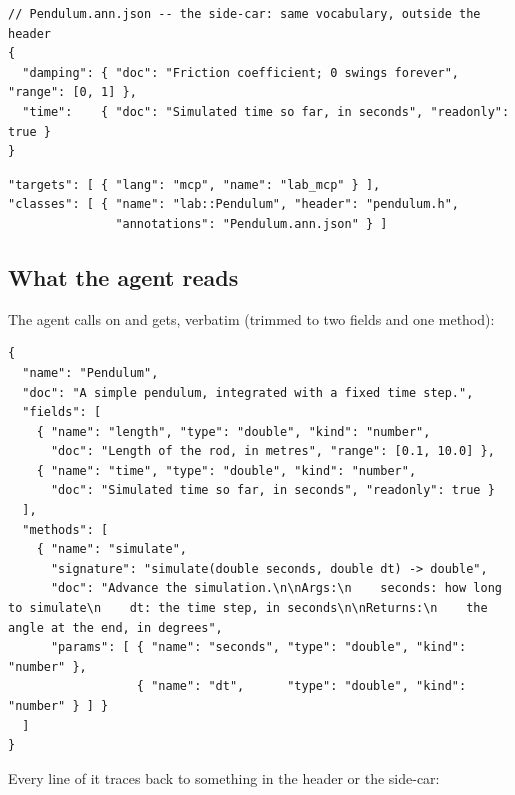 \begin{lstlisting}[style=json]
// Pendulum.ann.json -- the side-car: same vocabulary, outside the header
{
  "damping": { "doc": "Friction coefficient; 0 swings forever", "range": [0, 1] },
  "time":    { "doc": "Simulated time so far, in seconds", "readonly": true }
}
\end{lstlisting}

\begin{lstlisting}[style=json]
"targets": [ { "lang": "mcp", "name": "lab_mcp" } ],
"classes": [ { "name": "lab::Pendulum", "header": "pendulum.h",
               "annotations": "Pendulum.ann.json" } ]
\end{lstlisting}

\subsection*{What the agent reads}

The agent calls  on  and gets, verbatim
(trimmed to two fields and one method):

\begin{lstlisting}[style=json]
{
  "name": "Pendulum",
  "doc": "A simple pendulum, integrated with a fixed time step.",
  "fields": [
    { "name": "length", "type": "double", "kind": "number",
      "doc": "Length of the rod, in metres", "range": [0.1, 10.0] },
    { "name": "time", "type": "double", "kind": "number",
      "doc": "Simulated time so far, in seconds", "readonly": true }
  ],
  "methods": [
    { "name": "simulate",
      "signature": "simulate(double seconds, double dt) -> double",
      "doc": "Advance the simulation.\n\nArgs:\n    seconds: how long to simulate\n    dt: the time step, in seconds\n\nReturns:\n    the angle at the end, in degrees",
      "params": [ { "name": "seconds", "type": "double", "kind": "number" },
                  { "name": "dt",      "type": "double", "kind": "number" } ] }
  ]
}
\end{lstlisting}

Every line of it traces back to something in the header or the side-car:

